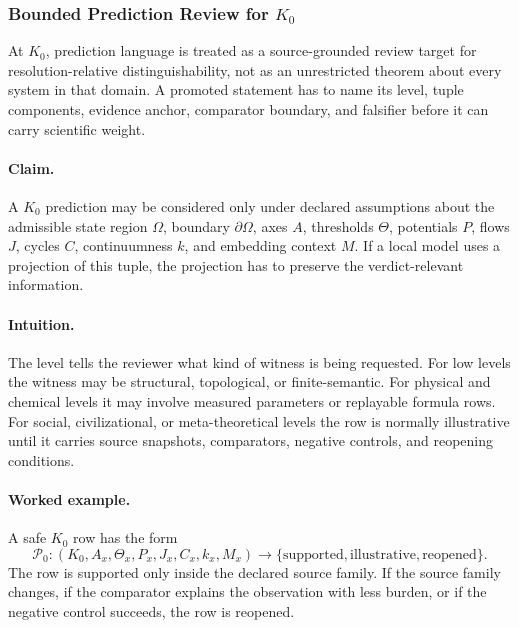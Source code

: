 \subsubsection{Bounded Prediction Review for \texorpdfstring{$K_0$}{K_0}}
\label{sec:predictions-k0-r014}

At \(K_0\), prediction language is treated as a source-grounded review
target for resolution-relative distinguishability, not as an unrestricted theorem about every system in that
domain. A promoted statement has to name its level, tuple components, evidence
anchor, comparator boundary, and falsifier before it can carry scientific
weight.

\paragraph{Claim.}
A \(K_0\) prediction may be considered only under declared assumptions
about the admissible state region \(\Omega\), boundary \(\partial\Omega\), axes
\(A\), thresholds \(\Theta\), potentials \(P\), flows \(J\), cycles \(C\),
continuumness \(k\), and embedding context \(M\). If a local model uses a
projection of this tuple, the projection has to preserve the verdict-relevant
information.

\paragraph{Intuition.}
The level tells the reviewer what kind of witness is being requested. For low
levels the witness may be structural, topological, or finite-semantic. For
physical and chemical levels it may involve measured parameters or replayable
formula rows. For social, civilizational, or meta-theoretical levels the row is
normally illustrative until it carries source snapshots, comparators, negative
controls, and reopening conditions.

\paragraph{Worked example.}
A safe \(K_0\) row has the form
\[
  \mathcal{P}_{0}:
  (K_0, A_x, \Theta_x, P_x, J_x, C_x, k_x, M_x)
  \longrightarrow
  \{\mathrm{supported},\mathrm{illustrative},\mathrm{reopened}\}.
\]
The row is supported only inside the declared source family. If the source
family changes, if the comparator explains the observation with less burden, or
if the negative control succeeds, the row is reopened.

